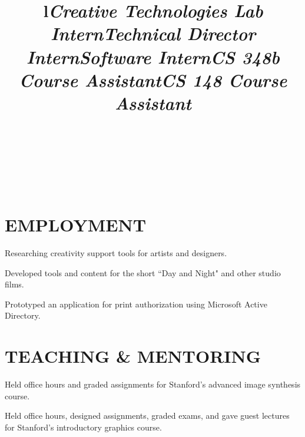 \documentclass[line,margin]{res}
\begin{document}
\begin{resume}


\begin{format}
\\
\title{l}\\
\body\\
\end{format}


\section{EMPLOYMENT}

\title{{\sl Creative Technologies Lab Intern}}
\begin{position}
Researching creativity support tools for artists and designers.
\end{position}

\title{{\sl Technical Director Intern}}
\begin{position}
Developed tools and content for the short ``Day and Night" and other studio films.
\end{position}

\title{{\sl Software Intern}}
\begin{position}
Prototyped an application for print authorization using Microsoft Active Directory.
\end{position}

\section{TEACHING \& MENTORING}

\title{{\sl CS 348b Course Assistant}}
\begin{position}
Held office hours and graded assignments for Stanford's advanced image synthesis course.
\end{position}

\title{{\sl CS 148 Course Assistant}}
\begin{position}
Held office hours, designed assignments, graded exams, and gave guest lectures for Stanford's introductory graphics course.
\end{position}


\end{resume}
\end{document}
